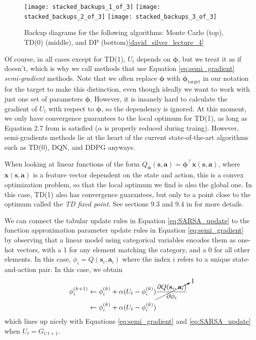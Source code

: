 \documentclass{article}
\begin{document}
\begin{figure}
\label{fig:back_up_diagrams}
    \begin{center}
    \texttt{[image: stacked\_backups\_1\_of\_3]}
    \texttt{[image: stacked\_backups\_2\_of\_3]}
    \texttt{[image: stacked\_backups\_3\_of\_3]}
    \caption{Backup diagrams for the following algorithms: Monte Carlo (top), TD(0) (middle), and DP (bottom)\ref{david_silver_lecture_4}}
    \label{fig:basis_small_width}
    \end{center}
\end{figure}

Of course, in all cases except for TD(1), $U_t$ depends on $\boldsymbol{\phi}$, but we treat it as if doesn't, which is why we call methods that use Equation \ref{eq:semi_gradient} \textit{semi-gradient} methods. Note that we often replace $\boldsymbol{\phi}$ with $\boldsymbol{\phi}_\text{target}$ in our notation for the target to make this distinction, even though ideally we want to work with just one set of parameters  $\boldsymbol{\phi}$. However, it is insanely hard to calculate the gradient of $U_t$ with respect to $\boldsymbol{\phi}$, so the dependency is ignored. At this moment, we only have convergence guarantees to the local optimum for TD(1), as long as Equation 2.7 from \cite{sutton_barto_rl} is satisfied ($\alpha$ is properly reduced during traing). However, semi-gradients methods lie at the heart of the current state-of-the-art algorithms such as TD(0), DQN\cite{bootstrap_DQN}, and DDPG\cite{ddpg} anyways. 

When looking at linear functions of the form $Q_{\boldsymbol{\phi}}(\mathbf{s},\mathbf{a})=\boldsymbol{\phi}^\top\mathbf{x}(\mathbf{s},\mathbf{a})$, where $\mathbf{x}(\mathbf{s},\mathbf{a})$ is a feature vector dependent on the state and action, this is a convex optimization problem, so that the local optimum we find is also the global one. In this case, TD(1) also has convergence guarantees, but only to a point close to the optimum called the \textit{TD fixed point}. See sections 9.3 and 9.4 in \cite{sutton_barto_rl} for more details.

We can connect the tabular update rules in Equation \ref{eq:SARSA_update} to the function approximation parameter update rules in Equation \ref{eq:semi_gradient} by observing that a linear model using categorical variables encodes them as one-hot vectors, with a 1 for any element matching the category, and a 0 for all other elements. In this case, $\phi_i=Q(\mathbf{s}_i,\mathbf{a}_i)$ where the index $i$ refers to a unique state-and-action pair. In this case, we obtain 
\begin{equation}
\begin{split}
\phi_i^{(k+1)}&\leftarrow\phi_i^{(k)}+\alpha(U_t-\phi_i^{(k)})\cancelto{1}{\frac{\partial Q(\mathbf{s}_i,\mathbf{a}_i)}{\partial \phi_i}}\\&\leftarrow\phi_i^{(k)}+\alpha(U_t-\phi_i^{(k)})\end{split}\end{equation}which lines up nicely with Equations \ref{eq:semi_gradient} and \ref{eq:SARSA_update} when $U_t=G_{t:t+1}$. 
\end{document}
